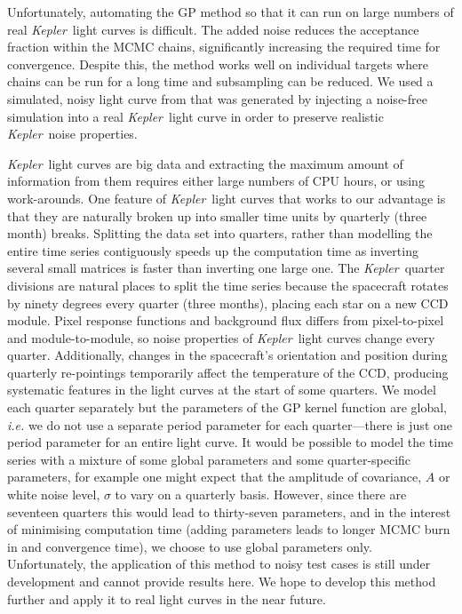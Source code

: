 \documentclass[useAMS, usenatbib, preprint, 12pt]{aastex}
\newcommand{\Kepler}{{\it Kepler}}
\newcommand{\kepler}{\Kepler}
\begin{document}
Unfortunately, automating the GP method so that it can run on large numbers of
real \kepler\ light curves is difficult.
The added noise reduces the acceptance fraction within the MCMC chains,
significantly increasing the required time for convergence.
Despite this, the method works well on individual targets where chains can be
run for a long time and subsampling can be reduced.
We used a simulated, noisy light curve from \citet{Aigrain2015} that was
generated by injecting a noise-free simulation into a real \kepler\ light
curve in order to preserve realistic \kepler\ noise properties.

\kepler\ light curves are big data and extracting the maximum amount of
information from them requires either large numbers of CPU hours, or using
work-arounds.
One feature of \kepler\ light curves that works to our advantage is that they
are naturally broken up into smaller time units by quarterly (three month)
breaks.
Splitting the data set into quarters, rather than modelling the entire time
series contiguously speeds up the computation time as inverting several
small matrices is faster than inverting one large one.
The \kepler\ quarter divisions are natural places to split the time series
because the spacecraft rotates by ninety degrees every quarter (three months),
placing each star on a new CCD module.
Pixel response functions and background flux differs from pixel-to-pixel and
module-to-module, so noise properties of \kepler\ light curves change every
quarter.
Additionally, changes in the spacecraft's orientation and position during
quarterly re-pointings temporarily affect the temperature of the CCD,
producing systematic features in the light curves at the start of some
quarters.
We model each quarter separately but the parameters of the GP kernel function
are global, {\it i.e.} we do not use a separate period parameter for each
quarter---there is just one period parameter for an entire light curve.
It would be possible to model the time series with a mixture of some global
parameters and some quarter-specific parameters, for example one might expect
that the amplitude of covariance, $A$ or white noise level, $\sigma$ to vary
on a quarterly basis.
However, since there are seventeen quarters this would lead to thirty-seven
parameters, and in the interest of minimising computation time (adding
parameters leads to longer MCMC burn in and convergence time), we choose to
use global parameters only.
Unfortunately, the application of this method to noisy test cases is still
under development and cannot provide results here.
We hope to develop this method further and apply it to real light curves in
the near future.
\end{document}
